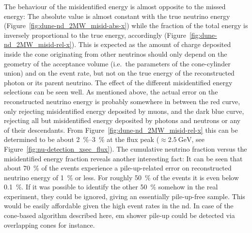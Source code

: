 The behaviour of the misidentified energy is almost opposite to the missed energy:
The absolute value is almost constant with the true neutrino energy (Figure~\ref{fig:dune-nd_2MW_misid-abs-x}) while the fraction of the total energy is inversely proportional to the true energy, accordingly (Figure~\ref{fig:dune-nd_2MW_misid-rel-x}).
This is expected as the amount of charge deposited inside the cone originating from other neutrinos should only depend on the geometry of the acceptance volume (i.e.\ the parameters of the cone-cylinder union) and on the event rate, but not on the true energy of the reconstructed photon or its parent neutrino.
The effect of the different misidentified energy selections can be seen well.
As mentioned above, the actual error on the reconstructed neutrino energy is probably somewhere in between the red curve, only rejecting misidentified energy deposited by muons, and the dark blue curve, rejecting all but misidentified energy deposited by photons and neutrons or any of their descendants.
From Figure~\ref{fig:dune-nd_2MW_misid-rel-x} this can be determined to be about \SIrange{2}{3}{\percent} at the flux peak ($\approx \SI{2.5}{\giga\electronvolt}$, see Figure~\ref{fig:nu-detection_xsec_flux}).
The cumulative neutrino fraction versus the misidentified energy fraction reveals another interesting fact:
It can be seen that about \SI{70}{\percent} of the events experience a pile-up-related error on reconstructed neutrino energy of \SI{1}{\percent} or less.
For roughly \SI{50}{\percent} of the events it is even below \SI{0.1}{\percent}.
If it was possible to identify the other \SI{50}{\percent} somehow in the real experiment, they could be ignored, giving an essentially pile-up-free sample.
This would be easily affordable given the high event rates in the \gls{nd}.
In case of the cone-based algorithm described here, \gls{em} shower pile-up could be detected via overlapping cones for instance.

